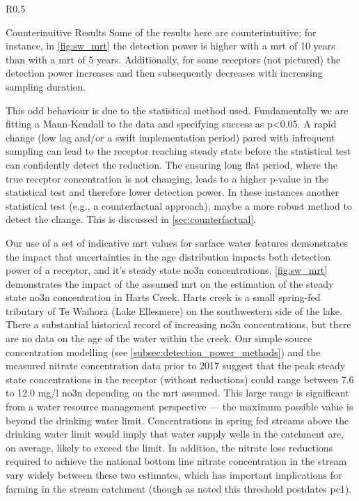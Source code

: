 \begin{wrapfigure}{R}{0.5\textwidth}
    \begin{breakawaybox}[
        label={box:wierdresults}]{Counterinuitive Results}
        Some of the results here are counterintuitive; for instance, in \autoref{fig:sw_mrt} the detection power is higher with a \gls{mrt} of 10 years than with a \gls{mrt} of 5 years. Additionally, for some receptors (not pictured) the detection power increases and then subsequently decreases with increasing sampling duration.

        This odd behaviour is due to the statistical method used. Fundamentally we are fitting a Mann-Kendall to the data and specifying success as p<0.05. A rapid change (low lag and/or a swift implementation period) pared with infrequent sampling can lead to the receptor reaching steady state before the statistical test can confidently detect the reduction. The ensuring long flat period, where the true receptor concentration is not changing, leads to a higher p-value in the statistical test and therefore lower detection power. In these instances another statistical test (e.g., a counterfactual approach), maybe a more robust method to detect the change. This is discussed in \autoref{sec:counterfactual}.
    \end{breakawaybox}
\end{wrapfigure}

Our use of a set of indicative \gls{mrt} values for surface water features demonstrates the impact that uncertainties in the age distribution impacts both detection power of a receptor, and it's steady state \gls{no3n} concentrations.
\autoref{fig:sw_mrt} demonstrates the impact of the assumed \gls{mrt} on the estimation of the steady state \gls{no3n} concentration in Harts Creek.
Harts creek is a small spring-fed tributary of Te Waihora (Lake Ellesmere) on the southwestern side of the lake.
There a substantial historical record of increasing \gls{no3n} concentrations, but there are no data on the age of the water within the creek.
Our simple source concentration modelling (see \autoref{subsec:detection_power_methods}) and the measured nitrate concentration data prior to 2017 suggest that the peak steady state concentrations in the receptor (without reductions) could range between 7.6 to 12.0 mg/l \gls{no3n} depending on the \gls{mrt} assumed.
This large range is significant from a water resource management perspective --- the maximum possible value is beyond the drinking water limit.
Concentrations in spring fed streams above the drinking water limit would imply that water supply wells in the catchment are, on average, likely to exceed the limit.
In addition, the nitrate loss reductions required to achieve the national bottom line nitrate concentration in the stream vary widely between these two estimates, which has important implications for farming in the stream catchment (though as noted this threshold postdates \gls{pc1}).

